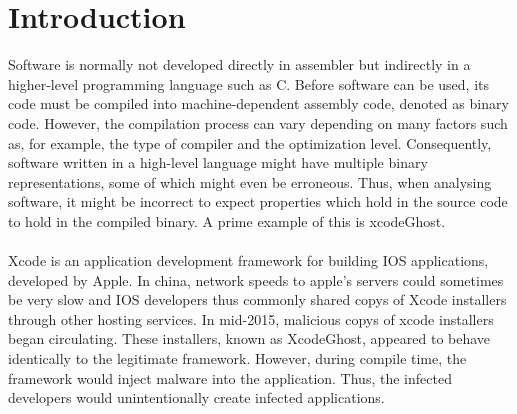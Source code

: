 \documentclass{kththesis}
\begin{document}
\mainmatter
\cleardoublepage
{}


\chapter{Introduction}
%
Software is normally not developed directly in assembler but indirectly in a higher-level programming language such as C. Before software can be used, its code must be compiled into machine-dependent assembly code, denoted as binary code. However, the compilation process can vary depending on many factors such as, for example, the type of compiler and the optimization level. Consequently, software written in a high-level language might have multiple binary representations, some of which might even be erroneous\cite{preciseCFG}. Thus, when analysing software, it might be incorrect to expect properties which hold in the source code to hold in the compiled binary. A prime example of this is xcodeGhost.
\\ \\
Xcode is an application development framework for building IOS applications, developed by Apple\cite{Xcode}. In china, network speeds to apple's servers could sometimes be very slow and IOS developers thus commonly shared copys of Xcode installers through other hosting services\cite{XcodeGhost}. In mid-2015, malicious copys of xcode installers began circulating. These installers, known as XcodeGhost\cite{XcodeGhost}, appeared to behave identically to the legitimate framework. However, during compile time, the framework would inject malware into the application. Thus, the infected developers would unintentionally create infected applications. 
\\ \\
\end{document}

